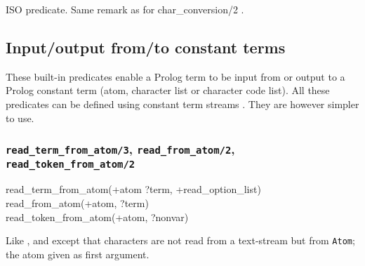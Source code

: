 \begin{PlErrors}



\end{PlErrors}

\Portability

ISO predicate. Same remark as for char\_conversion/2
.

\subsection{Input/output from/to constant terms}
\label{Input/output-from/to-constant-terms}
These built-in predicates enable a Prolog term to be input from or output to
a Prolog constant term (atom, character list or character code list). All
these predicates can be defined using constant term streams
. They are however simpler to use.

\subsubsection{\texttt{read\_term\_from\_atom/3},
               \texttt{read\_from\_atom/2},
               \texttt{read\_token\_from\_atom/2}}
\label{read-term-from-atom/3}

\begin{TemplatesOneCol}
read\_term\_from\_atom(+atom ?term, +read\_option\_list)\\
read\_from\_atom(+atom, ?term)\\
read\_token\_from\_atom(+atom, ?nonvar)

\end{TemplatesOneCol}

\Description

\texttt{}%
\texttt{}%
\texttt{}%
Like ,   and
  except that characters are not
read from a text-stream but from \texttt{Atom}; the atom given as first
argument.

\begin{PlErrors}




\end{PlErrors}

